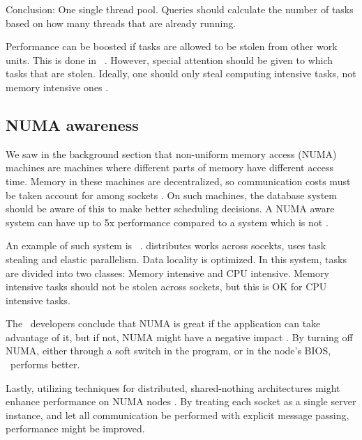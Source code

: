Conclusion: One single thread pool. Queries should calculate the number of tasks based on how many threads that are already running.

Performance can be boosted if tasks are allowed to be stolen from other work units. This is done in \blink~\cite{Barber2012-xt}. However, special attention should be given to which tasks that are stolen. Ideally, one should only steal computing intensive tasks, not memory intensive ones \cite{Psaroudakis2015-lc}.


\subsection{NUMA awareness}
\label{sub:NUMA awareness}
We saw in the background section that non-uniform memory access (NUMA) machines are machines where different parts of memory have different access time. Memory in these machines are decentralized, so communication costs must be taken account for among sockets \cite{Psaroudakis2015-lc}. On such machines, the database system should be aware of this to make better scheduling decisions. A NUMA aware system can have up to 5x performance compared to a system which is not \cite{Psaroudakis2015-lc}. 

An example of such system is \hyper~\cite{Psaroudakis2014-ma, Psaroudakis2015-lc}. \hyper distributes works across socekts, uses task stealing and elastic parallelism. Data locality is optimized. In this system, tasks are divided into two classes: Memory intensive and CPU intensive. Memory intensive tasks should not be stolen across sockets, but this is OK for CPU intensive tasks.

The \qlikview~developers conclude that NUMA is great if the application can take advantage of it, but if not, NUMA might have a negative impact \cite{Qlik2013-an}. By turning off NUMA, either through a soft switch in the program, or in the node's BIOS, \qlikview~performs better.

Lastly, utilizing techniques for distributed, shared-nothing architectures might enhance performance on NUMA nodes \cite{Mukherjee2015-ul}. By treating each socket as a single server instance, and let all communication be performed with explicit message passing, performance might be improved.


